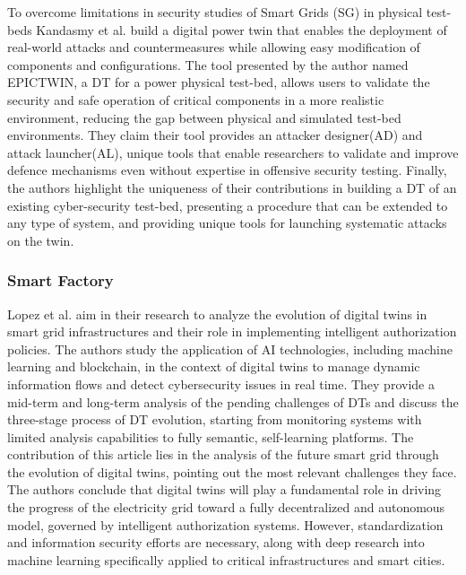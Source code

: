 To overcome limitations in security studies of Smart Grids (SG) in physical test-beds Kandasmy et al.\cite{kandasamyElectricPowerDigital2022} build a digital power twin that enables the deployment of real-world attacks and countermeasures while allowing easy modification of components and configurations. The tool presented by the author named EPICTWIN, a DT for a power physical test-bed, allows users to validate the security and safe operation of critical components in a more realistic environment, reducing the gap between physical and simulated test-bed environments. They claim their tool provides an attacker designer(AD) and attack launcher(AL), unique tools that enable researchers to validate and improve defence mechanisms even without expertise in offensive security testing. Finally, the authors highlight the uniqueness of their contributions in building a DT of an existing cyber-security test-bed, presenting a procedure that can be extended to any type of system, and providing unique tools for launching systematic attacks on the twin.

\subsubsection*{Smart Factory}
Lopez et al.\cite{lopezDIGITALTWINSINTELLIGENT2021} aim in their research to analyze the evolution of digital twins in smart grid infrastructures and their role in implementing intelligent authorization policies. The authors study the application of AI technologies, including machine learning and blockchain, in the context of digital twins to manage dynamic information flows and detect cybersecurity issues in real time. They provide a mid-term and long-term analysis of the pending challenges of DTs and discuss the three-stage process of DT evolution, starting from monitoring systems with limited analysis capabilities to fully semantic, self-learning platforms. The contribution of this article lies in the analysis of the future smart grid through the evolution of digital twins, pointing out the most relevant challenges they face. The authors conclude that digital twins will play a fundamental role in driving the progress of the electricity grid toward a fully decentralized and autonomous model, governed by intelligent authorization systems. However, standardization and information security efforts are necessary, along with deep research into machine learning specifically applied to critical infrastructures and smart cities.


